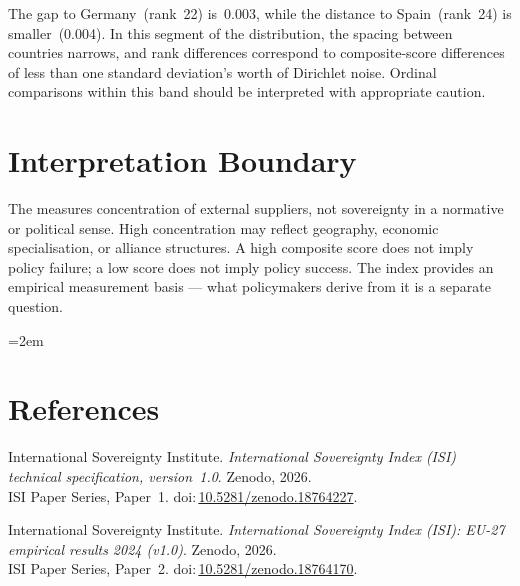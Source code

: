 \documentclass[12pt,a4paper]{article}
\begin{document}
The gap to Germany~(rank~22) is~0.003, while the distance to Spain~(rank~24) is smaller~(0.004).  In this segment of the distribution, the spacing between countries narrows, and rank differences correspond to composite-score differences of less than one standard deviation's worth of Dirichlet noise.  Ordinal comparisons within this band should be interpreted with appropriate caution.


\section{Interpretation Boundary}
\label{sec:interpretation}

The \ISI measures concentration of external suppliers, not sovereignty in a normative or political sense.  High concentration may reflect geography, economic specialisation, or alliance structures.  A high composite score does not imply policy failure; a low score does not imply policy success.  The index provides an empirical measurement basis --- what policymakers derive from it is a separate question.


\clearpage
\vspace*{1.5cm}

\begingroup\emergencystretch=2em
\section*{References}

\begin{enumerate}[label={[\arabic*]},leftmargin=2em,itemsep=6pt]
\item International Sovereignty Institute.
  \textit{International Sovereignty Index (ISI) technical specification, version~1.0}.
  Zenodo, 2026.\\ISI Paper Series, Paper~1.
  doi:\,\href{https://doi.org/10.5281/zenodo.18764227}{10.5281/zenodo.18764227}.

\item International Sovereignty Institute.
  \textit{International Sovereignty Index (ISI): EU-27 empirical results 2024 (v1.0)}.
  Zenodo, 2026.\\ISI Paper Series, Paper~2.
  doi:\,\href{https://doi.org/10.5281/zenodo.18764170}{10.5281/zenodo.18764170}.
\end{enumerate}
\endgroup
\end{document}
